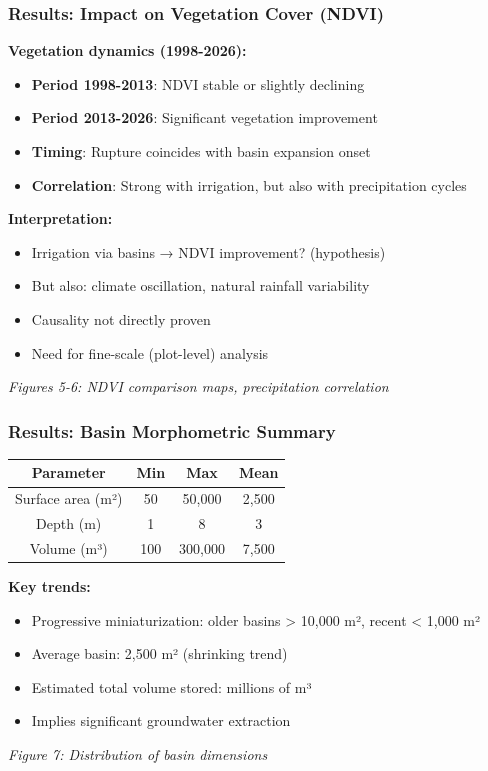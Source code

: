 \documentclass{beamer}
\begin{document}
\begin{frame}
\frametitle{Results: Impact on Vegetation Cover (NDVI)}
\textbf{Vegetation dynamics (1998-2026):}
\begin{itemize}
  \item \textbf{Period 1998-2013}: NDVI stable or slightly declining
  \item \textbf{Period 2013-2026}: Significant vegetation improvement
  \item \textbf{Timing}: Rupture coincides with basin expansion onset
  \item \textbf{Correlation}: Strong with irrigation, but also with precipitation cycles
\end{itemize}

\textbf{Interpretation:}
\begin{itemize}
  \item Irrigation via basins → NDVI improvement? (hypothesis)
  \item But also: climate oscillation, natural rainfall variability
  \item Causality not directly proven
  \item Need for fine-scale (plot-level) analysis
\end{itemize}

\begin{center}
  \small{\textit{Figures 5-6: NDVI comparison maps, precipitation correlation}}
\end{center}
\end{frame}

\begin{frame}
\frametitle{Results: Basin Morphometric Summary}
\begin{center}
  \small{
  \begin{tabular}{|c|c|c|c|}
    \hline
    \textbf{Parameter} & \textbf{Min} & \textbf{Max} & \textbf{Mean} \\
    \hline
    Surface area (m²) & 50 & 50,000 & 2,500 \\
    Depth (m) & 1 & 8 & 3 \\
    Volume (m³) & 100 & 300,000 & 7,500 \\
    \hline
  \end{tabular}
  }
\end{center}

\textbf{Key trends:}
\begin{itemize}
  \item Progressive miniaturization: older basins > 10,000 m², recent < 1,000 m²
  \item Average basin: 2,500 m² (shrinking trend)
  \item Estimated total volume stored: millions of m³
  \item Implies significant groundwater extraction
\end{itemize}

\begin{center}
  \small{\textit{Figure 7: Distribution of basin dimensions}}
\end{center}
\end{frame}
\end{document}
